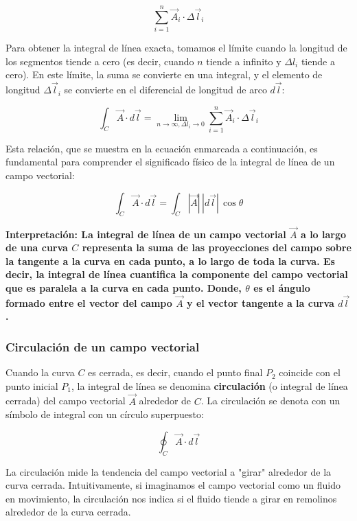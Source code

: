\documentclass{article}
\begin{document}
\[
\sum_{i=1}^n \vec{A}_i \cdot \Delta \vec{l}_i
\]

Para obtener la integral de línea exacta, tomamos el límite cuando la longitud de los segmentos tiende a cero (es decir, cuando $n$ tiende a infinito y $\Delta l_i$ tiende a cero). En este límite, la suma se convierte en una integral, y el elemento de longitud $\Delta \vec{l}_i$ se convierte en el diferencial de longitud de arco $d\vec{l}$:

\[
\int_C \vec{A} \cdot d\vec{l} = \lim_{n \to \infty, \Delta l_i \to 0} \sum_{i=1}^n \vec{A}_i \cdot \Delta \vec{l}_i
\]

Esta relación, que se muestra en la ecuación enmarcada a continuación, es fundamental para comprender el significado físico de la integral de línea de un campo vectorial:

\begin{equation}
\boxed{\int_C \vec{A} \cdot d\vec{l} = \int_C |\vec{A}| \, |d\vec{l}| \, \cos \theta}
\label{eq:int_linea_destacada}
\end{equation}

\textbf{Interpretación: La integral de línea de un campo vectorial $\vec{A}$ a lo largo de una curva $C$ representa la suma de las proyecciones del campo sobre la tangente a la curva en cada punto, a lo largo de toda la curva. Es decir, la integral de línea cuantifica la componente del campo vectorial que es paralela a la curva en cada punto. Donde, $\theta$ es el ángulo formado entre el vector del campo $\vec{A}$ y el vector tangente a la curva $d\vec{l}$.}

\subsubsection{Circulación de un campo vectorial}

Cuando la curva $C$ es cerrada, es decir, cuando el punto final $P_2$ coincide con el punto inicial $P_1$, la integral de línea se denomina \textbf{circulación} (o integral de línea cerrada) del campo vectorial $\vec{A}$ alrededor de $C$. La circulación se denota con un símbolo de integral con un círculo superpuesto:

\begin{equation}
\oint_C \vec{A} \cdot d\vec{l}
\end{equation}

La circulación mide la tendencia del campo vectorial a "girar" alrededor de la curva cerrada. Intuitivamente, si imaginamos el campo vectorial como un fluido en movimiento, la circulación nos indica si el fluido tiende a girar en remolinos alrededor de la curva cerrada.
\end{document}
